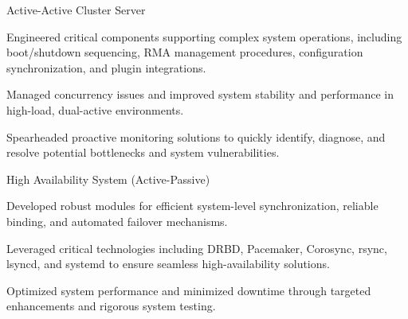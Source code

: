 

\begin{cventries}

  \cventry
    {} %
    {Active-Active Cluster Server} %
    {} %
    {} %
    {
      \vspace{-1.2em}
      \begin{cvitems} %
        \item {Engineered critical components supporting complex system operations, including boot/shutdown sequencing, RMA management procedures, configuration synchronization, and plugin integrations.}
        \item {Managed concurrency issues and improved system stability and performance in high-load, dual-active environments.}
        \item {Spearheaded proactive monitoring solutions to quickly identify, diagnose, and resolve potential bottlenecks and system vulnerabilities.}
      \end{cvitems}
    }

  \cventry
    {}
    {High Availability System (Active-Passive)} %
    {} %
    {} %
    {
      \vspace{-1.2em}
      \begin{cvitems} %
        \item {Developed robust modules for efficient system-level synchronization, reliable binding, and automated failover mechanisms.}
        \item {Leveraged critical technologies including DRBD, Pacemaker, Corosync, rsync, lsyncd, and systemd to ensure seamless high-availability solutions.}
        \item {Optimized system performance and minimized downtime through targeted enhancements and rigorous system testing.}
      \end{cvitems}
    }


\end{cventries}
